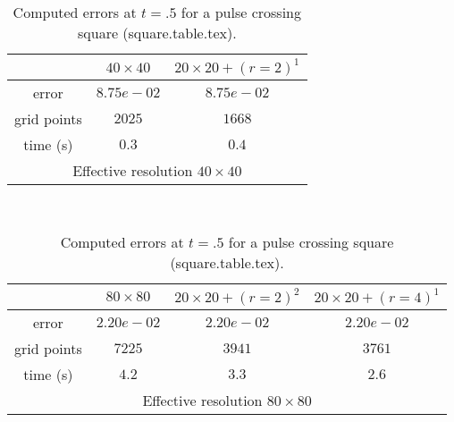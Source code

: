 \begin{table}[hbt]
\footnotesize
\begin{center}
\begin{tabular}{|c|c|c|}  \hline 
            & $40\times 40$  & $20\times20+ (r=2)^1$  \\   \hline 
 error      & $8.75e-02$     & $8.75e-02$  \\  
grid points & $2025$   &   $1668$     \\ 
time (s)    & $0.3$   &  $0.4$      \\ 
 \hline 
 \multicolumn{3}{c}{Effective resolution $40\times40$} \\ 
 \end{tabular}  \\ 
\vspace{.25\baselineskip}
\begin{tabular}{|c|c|c|c|}                   \hline 
       &  $80\times 80$ & $20\times20+ (r=2)^2$ & $20\times20+ (r=4)^1$  \\   \hline 
 error       & $2.20e-02$      & $2.20e-02$  & $2.20e-02$  \\  
 grid points &  $7225$  &  $3941$      &  $ 3761$      \\ 
 time (s)    &    $4.2$        &   $3.3$           &  $2.6$   \\ 
  \hline 
 \multicolumn{4}{c}{Effective resolution $80\times80$}  \\   
 \end{tabular}  
 \end{center}  
 \caption{Computed errors at $t=.5$ for a pulse crossing square (square.table.tex).}  
 \label{tab:amrh.square}  
 \end{table}  
